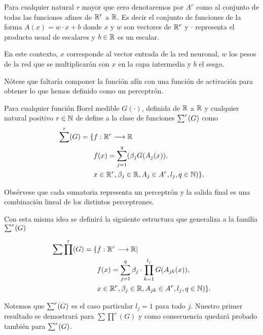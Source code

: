 \begin{definicion} 

    Para cualquier natural $r$ mayor que cero  denotaremos por $A^r$ como al conjunto de todas 
    las funciones afines de $\mathbb{R}^r$ a $\mathbb{R}$. Es decir el conjunto de funciones de la forma 
    $A(x) = w \cdot x + b$ donde $x$ y $w$ son vectores de $\mathbb{R}^r$ y $\cdot$ representa el producto 
    usual de escalares y $b \in \mathbb{R}$ es un escalar.  
    
\end{definicion}  

En este contexto, $x$ corresponde al vector entrada de la red neuronal, $w$ los pesos de la red
que se multiplicarán con $x$ en la capa intermedia y $b$ el sesgo. 

Nótese que faltaría componer la función afín con una función de activación para obtener lo que hemos definido 
como un perceptrón. 

\begin{definicion} 
    Para cualquier función Borel medible $G(\cdot)$, definida de $\mathbb{R}$ a $\mathbb{R}$ y cualquier natural positivo
    $r \in \mathbb{N}$ de define a la clase de funciones $\sum ^r (G)$ como 
    \begin{equation}
        \begin{split}
        \sum ^r (G) = 
        \{ 
            & f: \mathbb{R} ^r \longrightarrow \mathbb{R} \\
            &f(x)=\sum_{j = 1} ^q (
            \beta_j G(A_{j}(x)), \\
            & x  \in \mathbb{R} ^r, \beta_j \in \mathbb{R}, A_{j}\in A^r, l_j,q \in \mathbb{N}
            )
        \}.
        \end{split}
    \end{equation}
\end{definicion}


Obsérvese que cada sumatoria representa un perceptrón y la salida final 
es una combinación lineal de los distintos perceptrones. 

Con esta misma idea se definirá la siguiente estructura que generaliza a la familia $\sum ^r (G)$  
   
\begin{definicion} 
    
    \begin{equation} 
        \begin{split}
        \sum \prod^r(G) = \{ 
        &f: \mathbb{R}^r \longrightarrow \mathbb{R} | \\
        & f(x) = \sum_{j = 1} ^q  \beta_j \cdot \prod_{k=1}^{l_j}
        G(A_{jk}(x)), \\
        &x  \in \mathbb{R}^r, \beta_j \in \mathbb{R}, A_{jk}\in A^r, l_j,q \in \mathbb{N}
        )
        \}.
    \end{split}
    \end{equation}  

    Notemos que $\sum ^r (G)$ es el caso particular $l_j = 1$ para todo $j$. Nuestro primer
    resultado se demostrará para $\sum \prod^r(G)$ y como consecuencia quedará probado
    también para $\sum ^r (G)$. 
\end{definicion}


